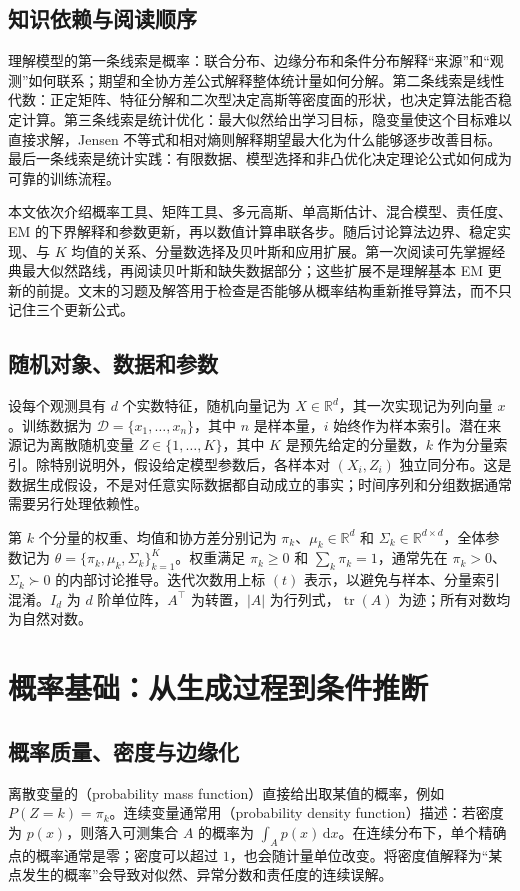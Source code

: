 \documentclass[UTF8]{ctexart}
\begin{document}
\subsection{知识依赖与阅读顺序}
理解模型的第一条线索是概率：联合分布、边缘分布和条件分布解释“来源”和“观测”如何联系；期望和全协方差公式解释整体统计量如何分解。第二条线索是线性代数：正定矩阵、特征分解和二次型决定高斯等密度面的形状，也决定算法能否稳定计算。第三条线索是统计优化：最大似然给出学习目标，隐变量使这个目标难以直接求解，Jensen 不等式和相对熵则解释期望最大化为什么能够逐步改善目标。最后一条线索是统计实践：有限数据、模型选择和非凸优化决定理论公式如何成为可靠的训练流程。

本文依次介绍概率工具、矩阵工具、多元高斯、单高斯估计、混合模型、责任度、EM 的下界解释和参数更新，再以数值计算串联各步。随后讨论算法边界、稳定实现、与 $K$ 均值的关系、分量数选择及贝叶斯和应用扩展。第一次阅读可先掌握经典最大似然路线，再阅读贝叶斯和缺失数据部分；这些扩展不是理解基本 EM 更新的前提。文末的习题及解答用于检查是否能够从概率结构重新推导算法，而不只记住三个更新公式。

\subsection{随机对象、数据和参数}
设每个观测具有 $d$ 个实数特征，随机向量记为 $X\in\mathbb R^d$，其一次实现记为列向量 $x$。训练数据为 $\mathcal D=\{x_1,\ldots,x_n\}$，其中 $n$ 是样本量，$i$ 始终作为样本索引。潜在来源记为离散随机变量 $Z\in\{1,\ldots,K\}$，其中 $K$ 是预先给定的分量数，$k$ 作为分量索引。除特别说明外，假设给定模型参数后，各样本对 $(X_i,Z_i)$ 独立同分布。这是数据生成假设，不是对任意实际数据都自动成立的事实；时间序列和分组数据通常需要另行处理依赖性。

第 $k$ 个分量的权重、均值和协方差分别记为 $\pi_k$、$\mu_k\in\mathbb R^d$ 和 $\Sigma_k\in\mathbb R^{d\times d}$，全体参数记为 $\theta=\{\pi_k,\mu_k,\Sigma_k\}_{k=1}^K$。权重满足 $\pi_k\geq0$ 和 $\sum_k\pi_k=1$，通常先在 $\pi_k>0$、$\Sigma_k\succ0$ 的内部讨论推导。迭代次数用上标 $(t)$ 表示，以避免与样本、分量索引混淆。$I_d$ 为 $d$ 阶单位阵，$A^\top$ 为转置，$|A|$ 为行列式，$\operatorname{tr}(A)$ 为迹；所有对数均为自然对数。

\section{概率基础：从生成过程到条件推断}
\label{sec:gmm-probability}

\subsection{概率质量、密度与边缘化}
离散变量的（probability mass function）直接给出取某值的概率，例如 $P(Z=k)=\pi_k$。连续变量通常用（probability density function）描述：若密度为 $p(x)$，则落入可测集合 $A$ 的概率为 $\int_Ap(x)\,\mathrm dx$。在连续分布下，单个精确点的概率通常是零；密度可以超过 $1$，也会随计量单位改变。将密度值解释为“某点发生的概率”会导致对似然、异常分数和责任度的连续误解。
\end{document}
